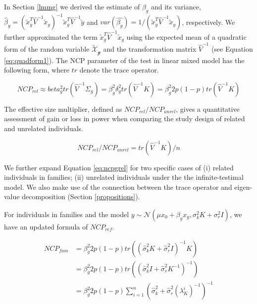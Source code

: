 \documentclass[]{book}
\begin{document}
In Section \ref{lmmg} we derived the estimate of \(\beta_g\) and its
variance,
\(\hat{\beta}_g = \left(\tilde{x}_g^T \hat{V}^{-1} \tilde{x}_g\right)^{-1} \tilde{x}_g^T \hat{V}^{-1} \tilde{y}\)
and
\(var(\hat{\beta_g}) = 1 / (\tilde{x}_g^T \hat{V}^{-1} \tilde{x}_g)\),
respectively. We further approximated the term
\(\tilde{x}_g^T \hat{V}^{-1} \tilde{x}_g\) using the expected mean of a
quadratic form of the random variable \(\mathcal{\tilde{X}_g}\) and the
transformation matrix \(\hat{V}^{-1}\) (see Equation
\eqref{eq:quadform1}). The NCP parameter of the test in linear mixed model
has the following form, where \(tr\) denote the trace operator.

\begin{equation}
NCP_{rel} \approx beta_g^2 tr(\hat{V}^{-1} \Sigma_g) = \beta_g^2 \delta_g^2 tr(\hat{V}^{-1} K) = \beta_g^2 2 p (1 - p) tr(\hat{V}^{-1} K)
\label{eq:ncpgrel}
\end{equation}

The effective size multiplier, defined as \(NCP_{rel} / NCP_{unrel}\),
gives a quantitative assessment of gain or loss in power when comparing
the study design of related and unrelated individuals.

\begin{equation}
NCP_{rel} / NCP_{unrel} = tr(\hat{V}^{-1} K) / n
\label{eq:ncpg}
\end{equation}

We further expand Equation \eqref{eq:ncpgrel} for two specific cases of
(i) related individuals in families; (ii) unrelated individuals under
the the infinite-testimal model. We also make use of the connection
between the trace operator and eigen-value decomposition (Section
\ref{propositions}).

For individuals in families and the model
\(y \sim \mathcal{N} (\mu x_0 + \beta_g x_g, \sigma_k^2 K + \sigma_r^2 I)\),
we have an updated formula of \(NCP_{ref}\).

\begin{equation}
\begin{split}
NCP_{fam} & = \beta_g^2 2 p (1 - p) tr \left( \left(\hat{\sigma}_k^2 K + \hat{\sigma}_r^2 I\right)^{-1} K \right)  \\
 & = \beta_g^2 2 p (1 - p) tr \left( \left(\hat{\sigma}_k^2 I + \hat{\sigma}_r^2 K^{-1}\right)^{-1} \right) \\
 & = \beta_g^2 2 p (1 - p) \sum_{i=1}^{n}{\left(\hat{\sigma}_k^2 + \hat{\sigma}_r^2 \left(\lambda_{K}^i\right)^{-1}\right)^{-1}}
\end{split}
\label{eq:ncpgfam}
\end{equation}
\end{document}
